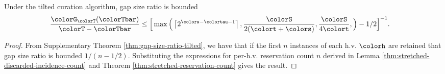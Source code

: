 \begin{theorem}
\label{thm:tilted-gap-size}
Under the tilted curation algorithm, gap size ratio is bounded
\begin{align*}
  \frac{\colorG_{\colorT}(\colorTbar)}{\colorT - \colorTbar}
  &\leq
  \Big[
    \max\Big(
      \left\lceil 2^{\colors - \colortau - 1} \right\rceil,
      \frac{\colorS}{2(\colort + \colors)},
      \frac{\colorS}{4\colort},
    \Big)
    - 1/2
  \Big]^{-1}.
\end{align*}
\end{theorem}
\begin{proof}

From Supplementary Theorem \ref{thm:gap-size-ratio-tilted}, we have that if the first $n$ instances of each h.v. $\colorh$ are retained that gap size ratio is bounded $1/(n - 1/2)$.
Substituting the expressions for per-h.v. reservation count $n$ derived in Lemma \ref{thm:stretched-discarded-incidence-count} and Theorem \ref{thm:stretched-reservation-count} gives the result.
\end{proof}
